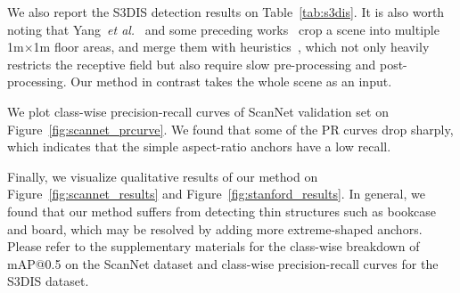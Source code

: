 \documentclass[runningheads]{llncs}
\newcommand{\etal}{\textit{et al.}}
\begin{document}
We also report the S3DIS detection results on Table~\ref{tab:s3dis}. It is also worth noting that Yang~\etal~\cite{yang2019learning} and some preceding works~\cite{wang2018sgpn,wang2019associatively} crop a scene into multiple 1m$\times$1m floor areas, and merge them with heuristics~\cite{wang2018sgpn}, which not only heavily restricts the receptive field but also require slow pre-processing and post-processing. Our method in contrast takes the whole scene as an input.

We plot class-wise precision-recall curves of ScanNet validation set on Figure~\ref{fig:scannet_prcurve}. We found that some of the PR curves drop sharply, which indicates that the simple aspect-ratio anchors have a low recall.




Finally, we visualize qualitative results of our method on Figure~\ref{fig:scannet_results} and Figure~\ref{fig:stanford_results}. In general, we found that our method suffers from detecting thin structures such as bookcase and board, which may be resolved by adding more extreme-shaped anchors. 
Please refer to the supplementary materials for the class-wise breakdown of mAP@0.5 on the ScanNet dataset and class-wise precision-recall curves for the S3DIS dataset.
\end{document}
